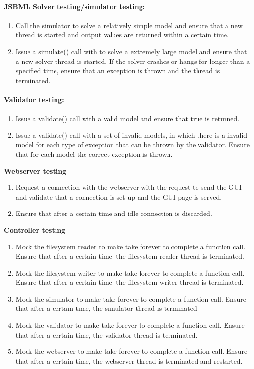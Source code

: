 \paragraph{JSBML Solver testing/simulator testing:}
\begin{enumerate}
\item 
Call the simulator  to solve a relatively simple model and ensure that a new thread is started and output values are returned within a certain time.
\item Issue a simulate() call with  to solve a extremely large model and ensure that a new solver thread is started. If the solver crashes or hangs for longer than a specified time, ensure that an exception is thrown and the thread is terminated.
\end{enumerate}

\paragraph{Validator testing:}

\begin{enumerate}
\item Issue a validate() call with a valid model and ensure that true is returned.
\item Issue a validate() call with a set of invalid models, in which there is a invalid model for each type of exception that can be thrown by the validator. Ensure that for each model the correct exception is thrown. 
\end{enumerate}
\textbf{Webserver testing}
\begin{enumerate}
\item Request a connection with the webserver with the request to send the GUI and validate that a connection is set up and the GUI page is  served. 
\item Ensure that after a certain time and idle connection is discarded.
\end{enumerate}
\textbf{Controller testing}
\begin{enumerate}
\item Mock the filesystem reader to make take forever to complete a function call. Ensure that after a certain time, the filesystem reader thread is terminated.
\item Mock the filesystem writer to make take forever to complete a function call. Ensure that after a certain time, the filesystem writer thread is terminated.

\item Mock the simulator to make take forever to complete a function call. Ensure that after a certain time, the  simulator thread is terminated.

\item Mock the validator to make take forever to complete a function call. Ensure that after a certain time, the  validator thread is terminated.

\item Mock the webserver to make take forever to complete a function call. Ensure that after a certain time, the  webserver thread is terminated and restarted.\end{enumerate}

